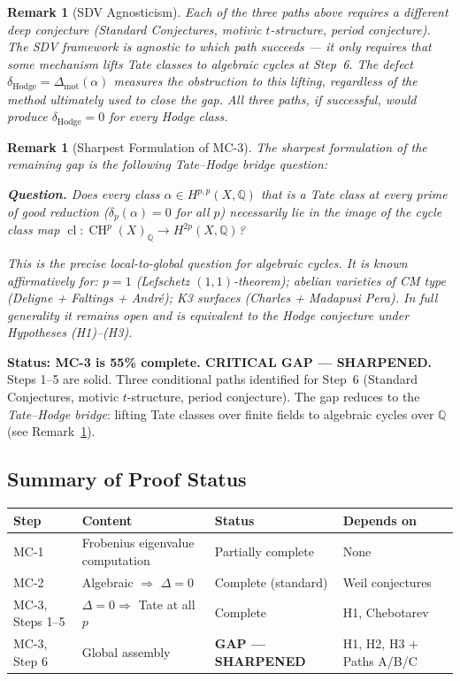 \documentclass[11pt]{article}
\newtheorem{remark}[theorem]{Remark}
\theoremstyle{definition}
\DeclareMathOperator{\cl}{cl}
\DeclareMathOperator{\CH}{CH}
\begin{document}
\begin{remark}[SDV Agnosticism]
\label{rem:sdv-agnostic}
Each of the three paths above requires a different deep conjecture (Standard
Conjectures, motivic $t$-structure, period conjecture).  The SDV framework is
agnostic to which path succeeds --- it only requires that \emph{some} mechanism
lifts Tate classes to algebraic cycles at Step~6.  The defect
$\delta_{\mathrm{Hodge}} = \Delta_{\mathrm{mot}}(\alpha)$ measures the
\emph{obstruction} to this lifting, regardless of the method ultimately used
to close the gap.  All three paths, if successful, would produce
$\delta_{\mathrm{Hodge}} = 0$ for every Hodge class.
\end{remark}

\begin{remark}[Sharpest Formulation of MC-3]
\label{rem:sharpest-mc3}
The sharpest formulation of the remaining gap is the following
\emph{Tate--Hodge bridge question}:

\medskip
\noindent\textbf{Question.}
Does every class $\alpha \in H^{p,p}(X, \mathbb{Q})$ that is a Tate class at
every prime of good reduction ($\delta_p(\alpha) = 0$ for all $p$) necessarily
lie in the image of the cycle class map
$\cl : \CH^p(X)_{\mathbb{Q}} \to H^{2p}(X, \mathbb{Q})$?

\medskip
\noindent
This is the precise local-to-global question for algebraic cycles.  It is
known affirmatively for: $p = 1$ (Lefschetz $(1,1)$-theorem); abelian
varieties of CM type (Deligne + Faltings + Andr\'e); K3 surfaces
(Charles + Madapusi Pera).  In full generality it remains open and is
equivalent to the Hodge conjecture under Hypotheses (H1)--(H3).
\end{remark}

\noindent\textbf{Status: MC-3 is 55\% complete.  CRITICAL GAP --- SHARPENED.}
Steps 1--5 are solid.  Three conditional paths identified for Step~6 (Standard
Conjectures, motivic $t$-structure, period conjecture).  The gap reduces to the
\emph{Tate--Hodge bridge}: lifting Tate classes over finite fields to algebraic
cycles over $\mathbb{Q}$ (see Remark~\ref{rem:sharpest-mc3}).

\subsection{Summary of Proof Status}

\begin{center}
\begin{tabular}{llll}
\hline
\textbf{Step} & \textbf{Content} & \textbf{Status} & \textbf{Depends on} \\
\hline
MC-1 & Frobenius eigenvalue computation & Partially complete & None \\
MC-2 & Algebraic $\Rightarrow$ $\Delta = 0$ & Complete (standard) & Weil conjectures \\
MC-3, Steps 1--5 & $\Delta = 0 \Rightarrow$ Tate at all $p$ & Complete & H1, Chebotarev \\
MC-3, Step 6 & Global assembly & \textbf{GAP --- SHARPENED} & H1, H2, H3 + Paths A/B/C \\
\hline
\end{tabular}
\end{center}
\end{document}
